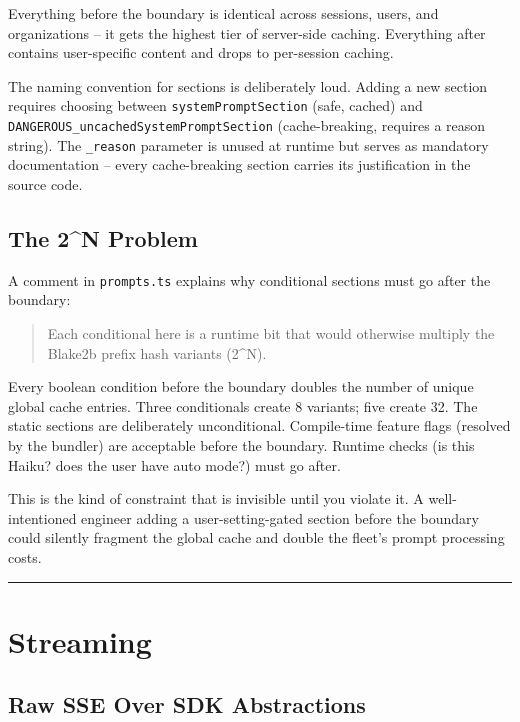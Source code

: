 \documentclass[
  english,
  11pt,
  letterpaper,
]{book}
\begin{document}
Everything before the boundary is identical across sessions, users, and
organizations -- it gets the highest tier of server-side caching.
Everything after contains user-specific content and drops to per-session
caching.

The naming convention for sections is deliberately loud. Adding a new
section requires choosing between \texttt{systemPromptSection} (safe,
cached) and \texttt{DANGEROUS\_uncachedSystemPromptSection}
(cache-breaking, requires a reason string). The \texttt{\_reason}
parameter is unused at runtime but serves as mandatory documentation --
every cache-breaking section carries its justification in the source
code.

\subsection{The 2\^{}N Problem}\label{the-2n-problem}

A comment in \texttt{prompts.ts} explains why conditional sections must
go after the boundary:

\begin{quote}
Each conditional here is a runtime bit that would otherwise multiply the
Blake2b prefix hash variants (2\^{}N).
\end{quote}

Every boolean condition before the boundary doubles the number of unique
global cache entries. Three conditionals create 8 variants; five create
32. The static sections are deliberately unconditional. Compile-time
feature flags (resolved by the bundler) are acceptable before the
boundary. Runtime checks (is this Haiku? does the user have auto mode?)
must go after.

This is the kind of constraint that is invisible until you violate it. A
well-intentioned engineer adding a user-setting-gated section before the
boundary could silently fragment the global cache and double the fleet's
prompt processing costs.

\begin{center}\rule{0.5\linewidth}{0.5pt}\end{center}

\section{Streaming}\label{streaming}

\subsection{Raw SSE Over SDK
Abstractions}\label{raw-sse-over-sdk-abstractions}
\end{document}
